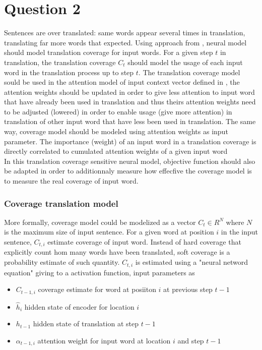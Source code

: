 \documentclass[a4paper]{article}
\begin{document}
\section{Question 2}
Sentences are over translated: same words appear several times in translation, translating far more words that expected. Using approach from \cite{zhaopeng2016}, neural model should model translation coverage for input words. For a given step $t$ in translation, the translation coverage $C_{t}$ should model the usage of each input word in the translation process up to step $t$. The translation coverage model sould be used in the attention model of input context vector defined in \cite{luong2015},  the attention weights should be updated in order to give less attention to input word that have already been used in translation and thus theirs attention weights need to be adjusted (lowered) in order to enable usage (give more attention) in translation of other input word that have less been used in translation. The same way, coverage model should be modeled using attention weights as input parameter. The importance (weight) of an input word in a translation coverage is directly correlated to cumulated attention weights of a given input word\\
In this translation coverage sensitive neural model, objective function should also be adapted in order to additionnaly measure how effecfive the coverage model is to measure the real coverage of input word.\\

\subsubsection{Coverage translation model}
More formally, coverage model could be modelized as a vector $C_{t} \in R^{N}$ where $N$ is the maximum size of input sentence. For a given word at position $i$ in the input sentence, $C_{t,i}$ estimate coverage of input word. Instead of hard coverage that explicitly count hom many words have been translated, soft coverage is a probability estimate of such quantity. $C_{t,i}$ is estimated using a "neural netword equation" giving to a activation function, input parameters as
\begin{itemize}
\item $C_{t-1,i}$ coverage estimate for word at posiiton $i$ at previous step $t-1$
\item $\widehat{h}_{i}$ hidden state of encoder for location $i$
\item $h_{t-1}$ hidden state of translation at step $t-1$
\item $\alpha_{t-1,i}$ attention weight for input word at location $i$ and step $t-1$
\end{itemize}
\end{document}
